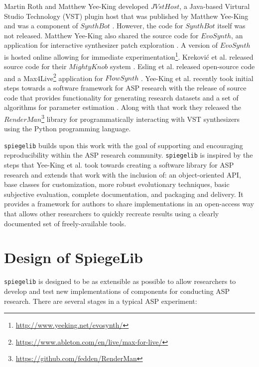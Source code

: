  Martin Roth and Matthew Yee-King developed $JVstHost$, a Java-based Virtural Studio Technology (VST) plugin host that was published by Matthew Yee-King \cite{yee2011automatic} and was a component of $SynthBot$ \cite{yee2008synthbot}. However, the code for $SynthBot$ itself was not released. Matthew Yee-King also shared the source code for $EvoSynth$, an application for interactive synthesizer patch exploration \cite{yee2016use}. A version of $EvoSynth$ is hosted online allowing for immediate experimentation\footnote{\url{http://www.yeeking.net/evosynth/}}. Krekovi{\'c} et al. released source code for their $MightyKnob$ system \cite{krekovic2016algorithm}. Esling et al. released open-source code and a Max4Live\footnote{\url{https://www.ableton.com/en/live/max-for-live/}} application for $FlowSynth$ \cite{esling2020flow}. Yee-King et al. recently took initial steps towards a software framework for ASP research with the release of source code that provides functionality for generating research datasets and a set of algorithms for parameter estimation \cite{yee2018automatic}. Along with that work they released the $RenderMan$\footnote{\url{https://github.com/fedden/RenderMan}} library for programmatically interacting with VST synthesizers using the Python programming language.
 
 \texttt{spiegelib} builds upon this work with the goal of supporting and encouraging reproducibility within the ASP research community. \texttt{spiegelib} is inspired by the steps that Yee-King et al. took towards creating a software library for ASP research and extends that work with the inclusion of: an object-oriented API, base classes for customization, more robust evolutionary techniques, basic subjective evaluation, complete documentation, and packaging and delivery. It provides a framework for authors to share implementations in an open-access way that allows other researchers to quickly recreate results using a clearly documented set of freely-available tools.
 
\section{Design of SpiegeLib}
\label{chapter:inverse_synth;section:spiegelib}

\texttt{spiegelib} is designed to be as extensible as possible to allow researchers to develop and test new implementations of components for conducting ASP research. There are several stages in a typical ASP experiment:

